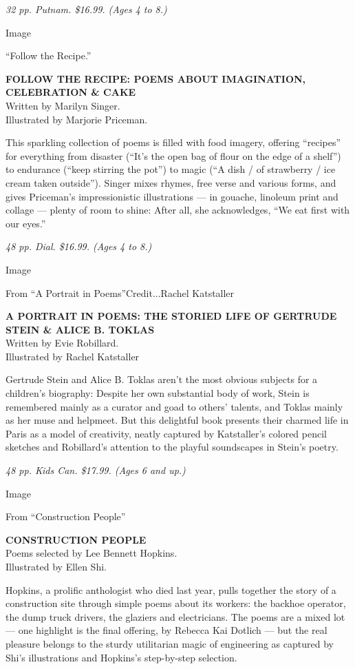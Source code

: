 \emph{32 pp. Putnam. \$16.99. (Ages 4 to 8.)}

Image

``Follow the Recipe.''

\textbf{FOLLOW THE RECIPE: POEMS ABOUT IMAGINATION, CELEBRATION \&
CAKE}\\
Written by Marilyn Singer.\\
Illustrated by Marjorie Priceman.

This sparkling collection of poems is filled with food imagery, offering
``recipes'' for everything from disaster (``It's the open bag of flour
on the edge of a shelf'') to endurance (``keep stirring the pot'') to
magic (``A dish / of strawberry / ice cream taken outside''). Singer
mixes rhymes, free verse and various forms, and gives Priceman's
impressionistic illustrations --- in gouache, linoleum print and collage
--- plenty of room to shine: After all, she acknowledges, ``We eat first
with our eyes.''

\emph{48 pp. Dial. \$16.99. (Ages 4 to 8.)}

Image

From ``A Portrait in Poems''Credit...Rachel Katstaller

\textbf{A PORTRAIT IN POEMS: THE STORIED LIFE OF GERTRUDE STEIN \& ALICE
B. TOKLAS}\\
Written by Evie Robillard.\\
Illustrated by Rachel Katstaller

Gertrude Stein and Alice B. Toklas aren't the most obvious subjects for
a children's biography: Despite her own substantial body of work, Stein
is remembered mainly as a curator and goad to others' talents, and
Toklas mainly as her muse and helpmeet. But this delightful book
presents their charmed life in Paris as a model of creativity, neatly
captured by Katstaller's colored pencil sketches and Robillard's
attention to the playful soundscapes in Stein's poetry.

\emph{48 pp. Kids Can. \$17.99. (Ages 6 and up.)}

Image

From ``Construction People''

\textbf{CONSTRUCTION PEOPLE}\\
Poems selected by Lee Bennett Hopkins.\\
Illustrated by Ellen Shi.

Hopkins, a prolific anthologist who died last year, pulls together the
story of a construction site through simple poems about its workers: the
backhoe operator, the dump truck drivers, the glaziers and electricians.
The poems are a mixed lot --- one highlight is the final offering, by
Rebecca Kai Dotlich --- but the real pleasure belongs to the sturdy
utilitarian magic of engineering as captured by Shi's illustrations and
Hopkins's step-by-step selection.

